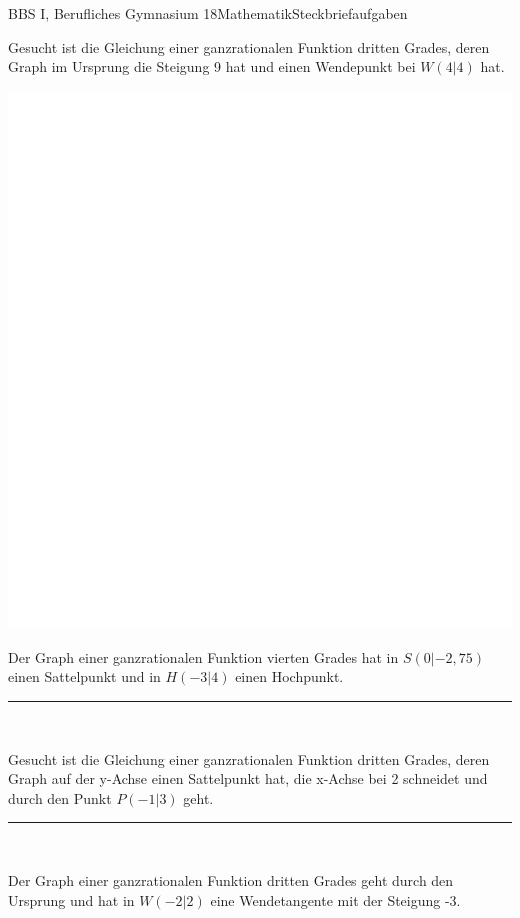 \documentclass[oneside,openany,headings=optiontotoc,11pt,numbers=noenddot]{scrreprt}
\begin{document}
		\begin{worksheet}{BBS I, Berufliches Gymnasium 18}{Mathematik}{Steckbriefaufgaben}
			\begin{framed}
				\noindent
				\onehalfspacing
				Gesucht ist die Gleichung einer ganzrationalen Funktion dritten Grades, deren Graph im Ursprung die Steigung 9 hat und einen Wendepunkt bei \(W(4|4)\) hat.\\
				\par\bigskip\noindent
				\includegraphics[width=1.1\textwidth]{../../empty.jpg}\\
				\par\bigskip\noindent
				Der Graph einer ganzrationalen Funktion vierten Grades hat in \(S(0|-2,75)\) einen Sattelpunkt und in \(H(-3|4)\) einen Hochpunkt.
				\par\bigskip\noindent
				\rule{\textwidth}{0.1pt}\\
				\par\bigskip\noindent
				Gesucht ist die Gleichung einer ganzrationalen Funktion dritten Grades, deren Graph auf der y-Achse einen Sattelpunkt hat, die x-Achse bei 2 schneidet und durch den Punkt \(P(-1|3)\) geht.\\
				\par\bigskip\noindent
				\rule{\textwidth}{0.1pt}\\
				\par\bigskip\noindent
				Der Graph einer ganzrationalen Funktion dritten Grades geht durch den Ursprung und hat in \(W(-2|2)\) eine Wendetangente mit der Steigung -3.
			\end{framed}
		\end{worksheet}
\end{document}
